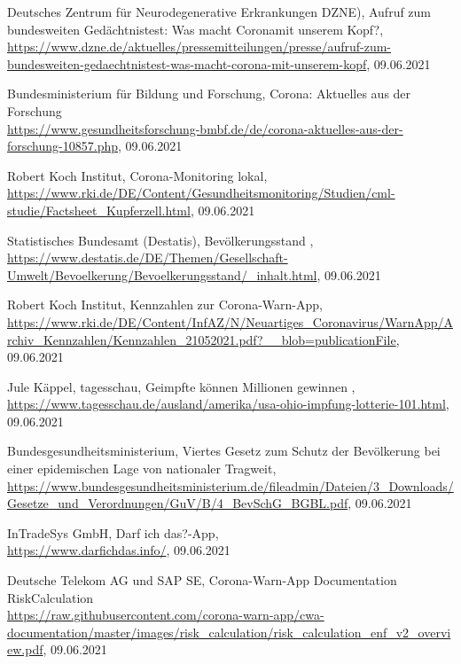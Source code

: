 \documentclass[conference,compsoc]{IEEEtran}
\begin{document}
\begin{thebibliography}{00}
 Deutsches Zentrum für Neurodegenerative Erkrankungen DZNE), \glqq Aufruf zum bundesweiten Gedächtnistest: Was macht \glqq Corona\grqq mit unserem Kopf?\grqq, \\\url{https://www.dzne.de/aktuelles/pressemitteilungen/presse/aufruf-zum-bundesweiten-gedaechtnistest-was-macht-corona-mit-unserem-kopf}, 09.06.2021

Bundesministerium für Bildung und Forschung, \glqq Corona: Aktuelles aus der Forschung\grqq \\\url{https://www.gesundheitsforschung-bmbf.de/de/corona-aktuelles-aus-der-forschung-10857.php}, 09.06.2021

 Robert Koch Institut, \glqq Corona-Monitoring lokal\grqq,\\ \url{https://www.rki.de/DE/Content/Gesundheitsmonitoring/Studien/cml-studie/Factsheet_Kupferzell.html}, 09.06.2021

 Statistisches Bundesamt (Destatis), \glqq Bevölkerungsstand \grqq,\\ \url{https://www.destatis.de/DE/Themen/Gesellschaft-Umwelt/Bevoelkerung/Bevoelkerungsstand/_inhalt.html}, 09.06.2021

Robert Koch Institut, \glqq Kennzahlen zur Corona-Warn-App\grqq,\\ \url{https://www.rki.de/DE/Content/InfAZ/N/Neuartiges_Coronavirus/WarnApp/Archiv_Kennzahlen/Kennzahlen_21052021.pdf?__blob=publicationFile}, 09.06.2021 

 Jule Käppel, tagesschau, \glqq Geimpfte können Millionen gewinnen \grqq, \url{https://www.tagesschau.de/ausland/amerika/usa-ohio-impfung-lotterie-101.html}, 09.06.2021

 Bundesgesundheitsministerium, \glqq Viertes Gesetz zum Schutz der Bevölkerung bei einer epidemischen Lage von nationaler Tragweit\grqq,\\ \url{https://www.bundesgesundheitsministerium.de/fileadmin/Dateien/3_Downloads/Gesetze_und_Verordnungen/GuV/B/4_BevSchG_BGBL.pdf}, 09.06.2021

 InTradeSys GmbH, \glqq Darf ich das?-App\grqq,
\\\url{https://www.darfichdas.info/}, 09.06.2021

 Deutsche Telekom AG und SAP SE, \glqq Corona-Warn-App Documentation RiskCalculation\grqq \\\url{https://raw.githubusercontent.com/corona-warn-app/cwa-documentation/master/images/risk_calculation/risk_calculation_enf\_v2_overview.pdf}, 09.06.2021


\end{thebibliography}
\end{document}
